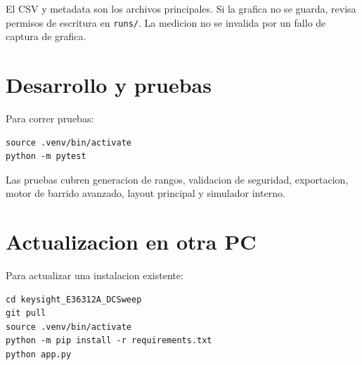 \documentclass[11pt,letterpaper]{article}
\begin{document}
El CSV y metadata son los archivos principales. Si la grafica no se guarda,
revisa permisos de escritura en \texttt{runs/}. La medicion no se invalida por
un fallo de captura de grafica.

\section{Desarrollo y pruebas}

Para correr pruebas:

\begin{verbatim}
source .venv/bin/activate
python -m pytest
\end{verbatim}

Las pruebas cubren generacion de rangos, validacion de seguridad, exportacion,
motor de barrido avanzado, layout principal y simulador interno.

\section{Actualizacion en otra PC}

Para actualizar una instalacion existente:

\begin{verbatim}
cd keysight_E36312A_DCSweep
git pull
source .venv/bin/activate
python -m pip install -r requirements.txt
python app.py
\end{verbatim}
\end{document}

